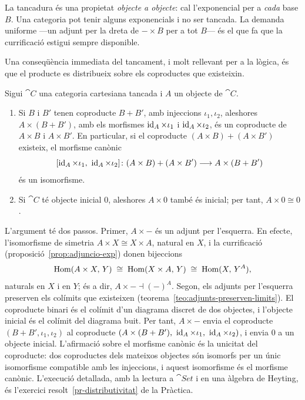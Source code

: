\begin{observacio}
La tancadura és una propietat \emph{objecte a objecte}: cal l'exponencial per a \emph{cada} base $B$. Una categoria pot tenir alguns exponencials i no ser tancada. La demanda uniforme ---un adjunt per la dreta de $-\times B$ per a tot $B$--- és el que fa que la currificació estigui sempre disponible.
\end{observacio}

Una conseqüència immediata del tancament, i molt rellevant per a la lògica, és que el producte es distribueix sobre els coproductes que existeixin.

\begin{proposicio}[Distributivitat]\label{prop:distributivitat}
Sigui $\cat{C}$ una categoria cartesiana tancada i $A$ un objecte de $\cat{C}$.
\begin{enumerate}
\item Si $B$ i $B'$ tenen coproducte $B+B'$, amb injeccions $\iota_1,\iota_2$, aleshores $A\times(B+B')$, amb els morfismes $\operatorname{id}_A\times\iota_1$ i $\operatorname{id}_A\times\iota_2$, és un coproducte de $A\times B$ i $A\times B'$. En particular, si el coproducte $(A\times B)+(A\times B')$ existeix, el morfisme canònic
\[
[\id_A\times\iota_1,\ \id_A\times\iota_2]\colon(A\times B)+(A\times B')\longrightarrow A\times(B+B')
\]
és un isomorfisme.
\item Si $\cat{C}$ té objecte inicial $0$, aleshores $A\times 0$ també és inicial; per tant, $A\times 0\cong 0$.
\end{enumerate}
\end{proposicio}

\begin{prova}
L'argument té dos passos. Primer, $A\times-$ és un adjunt per l'esquerra. En efecte, l'isomorfisme de simetria $A\times X\cong X\times A$, natural en $X$, i la currificació (proposició~\ref{prop:adjuncio-exp}) donen bijeccions
\[
\operatorname{Hom}(A\times X,\,Y)\;\cong\;\operatorname{Hom}(X\times A,\,Y)\;\cong\;\operatorname{Hom}(X,\,Y^{A}),
\]
naturals en $X$ i en $Y$; és a dir, $A\times-\dashv(-)^{A}$. Segon, els adjunts per l'esquerra preserven els colímits que existeixen (teorema~\ref{teo:adjunts-preserven-limits}). El coproducte binari és el colímit d'un diagrama discret de dos objectes, i l'objecte inicial és el colímit del diagrama buit. Per tant, $A\times-$ envia el coproducte $(B+B',\iota_1,\iota_2)$ al coproducte $(A\times(B+B'),\ \id_A\times\iota_1,\ \id_A\times\iota_2)$, i envia $0$ a un objecte inicial. L'afirmació sobre el morfisme canònic és la unicitat del coproducte: dos coproductes dels mateixos objectes són isomorfs per un únic isomorfisme compatible amb les injeccions, i aquest isomorfisme és el morfisme canònic. L'execució detallada, amb la lectura a $\cat{Set}$ i en una àlgebra de Heyting, és l'exercici resolt~\ref{pr-distributivitat} de la Pràctica.
\end{prova}

